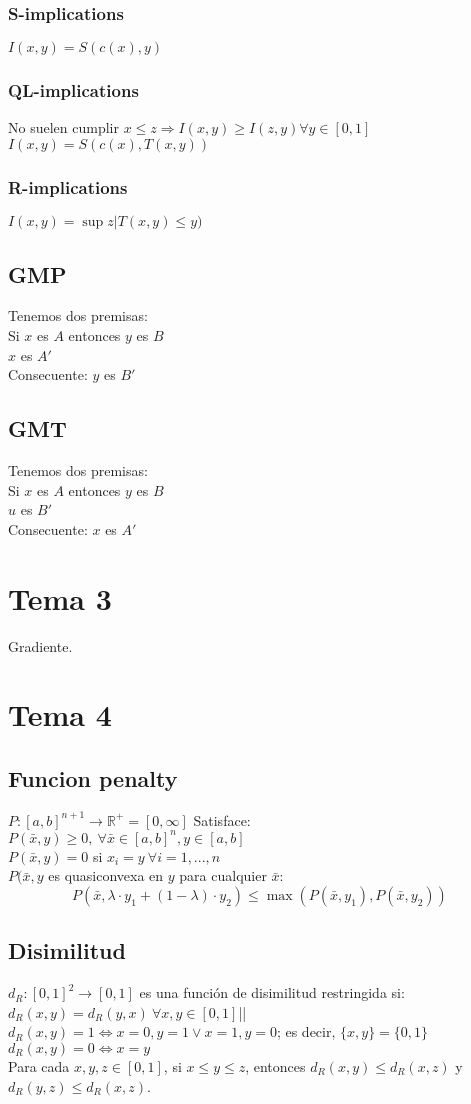 \documentclass[paper=a4, fontsize=11pt]{scrartcl} %
\begin{document}
\subsubsection{S-implications}
$I(x,y)=S(c(x),y)$
\subsubsection{QL-implications}
No suelen cumplir $x \leq z \Rightarrow I(x,y) \geq I(z,y) \forall y \in [0,1]$\\
$I(x,y)=S(c(x),T(x,y))$
\subsubsection{R-implications}
$I(x,y)=\sup {z|T(x,y) \leq y})$
\subsection{GMP}
Tenemos dos premisas:\\
Si $x$ es $A$ entonces $y$ es $B$\\
$x$ es $A'$\\
Consecuente: $y$ es $B'$
\subsection{GMT}
Tenemos dos premisas:\\
Si $x$ es $A$ entonces $y$ es $B$\\
$u$ es $B'$\\
Consecuente: $x$ es $A'$
\section{Tema 3}
Gradiente.
\section{Tema 4}
\subsection{Funcion penalty}
$P:[a,b]^{n+1}\rightarrow\mathbb{R}^+=[0,\infty]$ Satisface:\\
$P(\bar{x},y) \geq 0,\ \forall \bar{x}\in [a,b]^n,y\in [a,b]$\\
$P(\bar{x},y) = 0$ si $x_i = y\ \forall i=1,...,n$\\
$P(\bar{x},y$ es quasiconvexa en $y$ para cualquier $\bar{x}$:
$$P(\bar x,\lambda\cdot y_1+(1-\lambda)\cdot y_2) \leq \max(P(\bar{x},y_1),P(\bar{x},y_2))$$
\subsection{Disimilitud}
$d_R:[0,1]^2\rightarrow[0,1]$ es una función de disimilitud restringida si:
$d_R(x,y)=d_R(y,x)\ \forall x,y \in [0,1]$||
$d_R(x,y) = 1\iff x=0,y=1 \lor x=1,y=0$; es decir, $\{x,y\} = \{0,1\}$\\
$d_R(x,y) = 0\iff x=y$\\
Para cada $x,y,z\in [0,1]$, si $x \leq y \leq z$, entonces $d_R(x,y) \leq d_R(x,z)$ y $d_R(y,z) \leq d_R(x,z)$.
\end{document}
